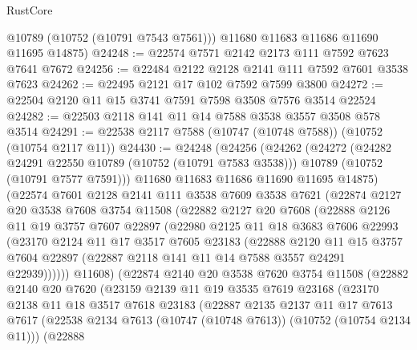 \begin{lexlean}{RustCore}
\begin{coremodule}
        @10789
        (@10752 (@10791 @7543 @7561)))
      @11680
      @11683
      @11686
      @11690
      @11695
      @14875)
@24248 := @22574 @7571 @2142 @2173 @111 @7592 @7623 @7641 @7672
@24256 := @22484 @2122 @2128 @2141 @111 @7592 @7601 @3538 @7623
@24262 := @22495 @2121 @17 @102 @7592 @7599 @3800
@24272 := @22504 @2120 @11 @15 @3741 @7591 @7598 @3508 @7576 @3514 @22524
@24282 := @22503 @2118 @141 @11 @14 @7588 @3538 @3557 @3508 @578 @3514
@24291 := @22538 @2117 @7588 (@10747 (@10748 @7588)) (@10752 (@10754 @2117 @11))
@24430 := @24248
    (@24256
      (@24262
        (@24272
          (@24282 @24291 @22550 @10789 (@10752 (@10791 @7583 @3538)))
          @10789
          (@10752 (@10791 @7577 @7591)))
        @11680
        @11683
        @11686
        @11690
        @11695
        @14875)
      (@22574
        @7601
        @2128
        @2141
        @111
        @3538
        @7609
        @3538
        @7621
        (@22874
          @2127
          @20
          @3538
          @7608
          @3754
          @11508
          (@22882
            @2127
            @20
            @7608
            (@22888
              @2126
              @11
              @19
              @3757
              @7607
              @22897
              (@22980
                @2125
                @11
                @18
                @3683
                @7606
                @22993
                (@23170
                  @2124
                  @11
                  @17
                  @3517
                  @7605
                  @23183
                  (@22888
                    @2120
                    @11
                    @15
                    @3757
                    @7604
                    @22897
                    (@22887 @2118 @141 @11 @14 @7588 @3557 @24291 @22939))))))
          @11608)
        (@22874
          @2140
          @20
          @3538
          @7620
          @3754
          @11508
          (@22882
            @2140
            @20
            @7620
            (@23159
              @2139
              @11
              @19
              @3535
              @7619
              @23168
              (@23170
                @2138
                @11
                @18
                @3517
                @7618
                @23183
                (@22887
                  @2135
                  @2137
                  @11
                  @17
                  @7613
                  @7617
                  (@22538 @2134 @7613 (@10747 (@10748 @7613)) (@10752 (@10754 @2134 @11)))
                  (@22888

\end{coremodule}
\end{lexlean}
